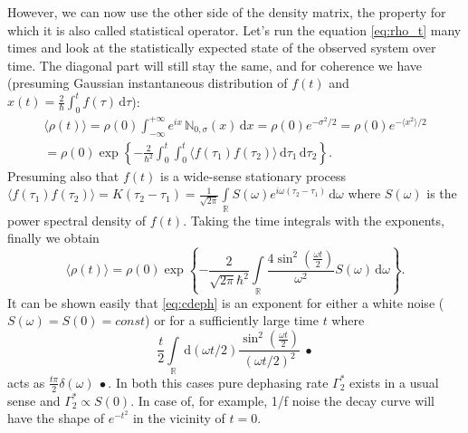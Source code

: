 \documentclass[12pt]{report}
\newcommand{\diff}{\,\mathrm{d}}
\numberwithin{equation}{section}
\begin{document}
However, we can now use the other side of the density matrix, the property for which it is also called statistical operator. Let's run the equation \eqref{eq:rho_t} many times and look at the statistically expected state of the observed system over time. The diagonal part will still stay the same, and for coherence we have (presuming Gaussian instantaneous distribution of $f(t)$ and $x(t) = \frac{2}{\hbar}\int_0^t f(\tau)  \diff \tau$):
\begin{gather}
\langle \rho(t) \rangle = \rho(0) \int_{-\infty}^{+\infty} e^{ix}\, \mathbb{N}_{0,\sigma}(x) \diff x = \rho(0) e^{-\sigma^2/2} = \rho(0) e^{-\langle x^2 \rangle/2} \\
= \rho(0)\exp \left\{ -\frac{2}{\hbar^2}\int_0^t\int_0^t \langle f(\tau_1) f(\tau_2) \rangle \diff \tau_1 \diff \tau_2 \right\}.
\end{gather}
Presuming also that $f(t)$ is a wide-sense stationary process $\langle f(\tau_1) f(\tau_2) \rangle = K(\tau_2 - \tau_1) = \frac{1}{\sqrt{2\pi}}\int\limits_\mathbb{R} S(\omega) e^{i\omega(\tau_2-\tau_1)}\diff\omega$ where $S(\omega)$ is the power spectral density of $f(t)$. Taking the time integrals with the exponents, finally we obtain
\begin{equation}
\langle \rho(t) \rangle = \rho(0) \exp  \left\{-\frac{2}{\sqrt{2\pi}\hbar^2} \int\limits_\mathbb{R} \frac{4 \sin^2(\frac{\omega t}{2})}{\omega^2} S(\omega)\diff \omega \right\}.\label{eq:cdeph}
\end{equation}
It can be shown easily that \eqref{eq:cdeph} is an exponent for either a white noise ($S(\omega) = S(0) = const$) or for a sufficiently large time $t$ where 
$$\frac{t}{2}\int\limits_\mathbb{R} \diff(\omega t/2) \frac{\sin^2(\frac{\omega t}{2})}{(\omega t/2)^2} \ \bullet $$
acts as $ \frac{t\pi}{2}\delta(\omega)\ \bullet$. In both this cases pure dephasing rate $\Gamma^*_2$ exists in a usual sense and $\Gamma^*_2 \propto S(0)$. In case of, for example, 1/f noise the decay curve will have the shape of $e^{-t^2}$ in the vicinity of $t=0$.
\end{document}
